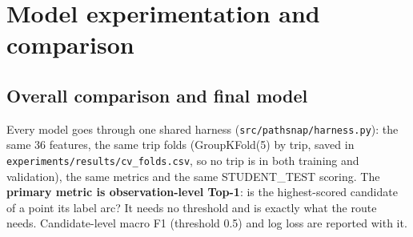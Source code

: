 \documentclass[11pt,a4paper]{article}
\begin{document}
\section{Model experimentation and comparison}
\subsection{Overall comparison and final model}
Every model goes through one shared harness (\texttt{src/pathsnap/harness.py}): the same 36 features, the same trip
folds (GroupKFold(5) by trip, saved in \texttt{experiments/results/cv\_folds.csv}, so no trip is in both training and
validation), the same metrics and the same STUDENT\_TEST scoring. The \textbf{primary metric is observation-level Top-1}:
is the highest-scored candidate of a point its label arc? It needs no threshold and is exactly what the route needs.
Candidate-level macro F1 (threshold 0.5) and log loss are reported with it.
\end{document}
